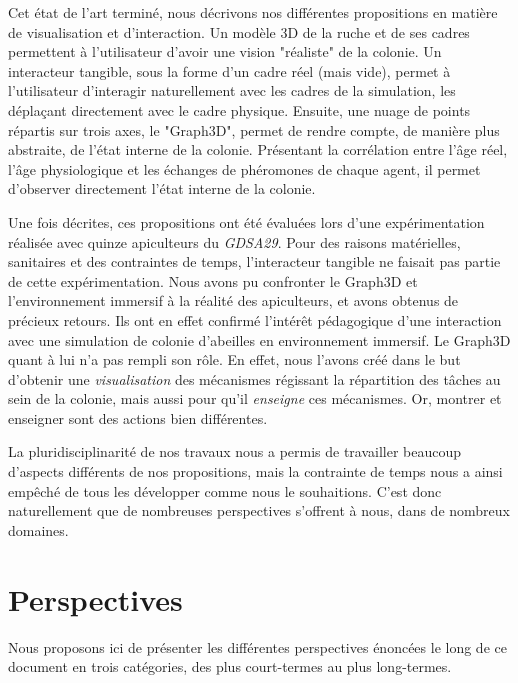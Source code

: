 Cet état de l'art terminé, nous décrivons nos différentes propositions en matière de visualisation et d'interaction. Un modèle 3D de la ruche et de ses cadres permettent à l'utilisateur d'avoir une vision "réaliste" de la colonie. Un interacteur tangible, sous la forme d'un cadre réel (mais vide), permet à l'utilisateur d'interagir naturellement avec les cadres de la simulation, les déplaçant directement avec le cadre physique. Ensuite, une nuage de points répartis sur trois axes, le "Graph3D", permet de rendre compte, de manière plus abstraite, de l'état interne de la colonie. Présentant la corrélation entre l'âge réel, l'âge physiologique et les échanges de phéromones de chaque agent, il permet d'observer directement l'état interne de la colonie.

Une fois décrites, ces propositions ont été évaluées lors d'une expérimentation réalisée avec quinze apiculteurs du \textit{GDSA29}. Pour des raisons matérielles, sanitaires et des contraintes de temps, l'interacteur tangible ne faisait pas partie de cette expérimentation. Nous avons pu confronter le Graph3D et l'environnement immersif à la réalité des apiculteurs, et avons obtenus de précieux retours. Ils ont en effet confirmé l'intérêt pédagogique d'une interaction avec une simulation de colonie d'abeilles en environnement immersif. Le Graph3D quant à lui n'a pas rempli son rôle. En effet, nous l'avons créé dans le but d'obtenir une \textit{visualisation} des mécanismes régissant la répartition des tâches au sein de la colonie, mais aussi pour qu'il \textit{enseigne} ces mécanismes. Or, montrer et enseigner sont des actions bien différentes.
	
	 La pluridisciplinarité de nos travaux nous a permis de travailler beaucoup d'aspects différents de nos propositions, mais la contrainte de temps nous a ainsi empêché de tous les développer comme nous le souhaitions. C'est donc naturellement que de nombreuses perspectives s'offrent à nous, dans de nombreux domaines.
	
\section*{Perspectives}
	Nous proposons ici de présenter les différentes perspectives énoncées le long de ce document en trois catégories, des plus court-termes au plus long-termes.
	
